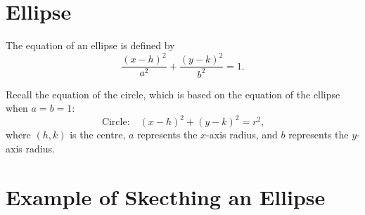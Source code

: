 \documentclass{article}
\begin{document}
\section*{Ellipse}
\begin{definitionbox}
The equation of an ellipse is defined by
\[
    \dfrac{(x - h)^2}{a^2} + \dfrac{(y - k)^2}{b^2} = 1 \text{.}
\]
\begin{notebox}
Recall the equation of the circle, which is based on the equation of the ellipse when \( a = b = 1 \):
\[
    \text{Circle:} \quad (x - h)^2 + (y - k)^2 = r^2 \text{,}
\]
where \( (h, k) \) is the centre, \( a \) represents the \( x \)-axis radius, and \( b \) represents the \( y \)-axis radius.
\end{notebox}
\end{definitionbox}

\section*{Example of Skecthing an Ellipse}
\end{document}
